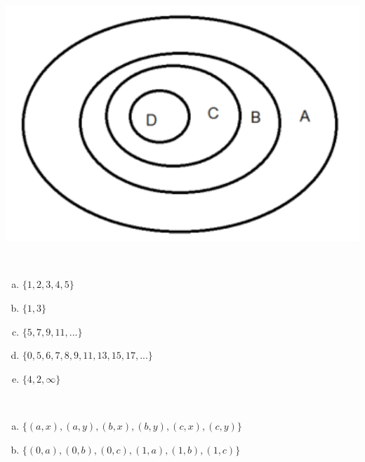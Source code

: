 \begin{Gabarito}{18}
~

    \begin{center}
        \includegraphics[width=.4\linewidth]{Figs/conjuntos2.png}
    \end{center}
\end{Gabarito}
\begin{Gabarito}{19}
~

    \begin{multicols}{2}
    \begin{enumerate}[a)]
        \item $\{1,2,3,4,5\}$
        \item $\{1,3\}$
        \item $\{5,7,9,11,...\}$
        \item $\{0,5,6,7,8,9,11,13,15,17,...\}$
        \item $\{ 4, 2, \infty\}$
    \end{enumerate}
\end{multicols}

\end{Gabarito}
\begin{Gabarito}{20}
~

    \begin{enumerate}[a)]
        \item $\{(a,x),(a,y),(b,x),(b,y),(c,x),(c,y)\}$
        \item $\{(0,a),(0,b),(0,c),(1,a),(1,b),(1,c)\}$
    \end{enumerate}
\end{Gabarito}
